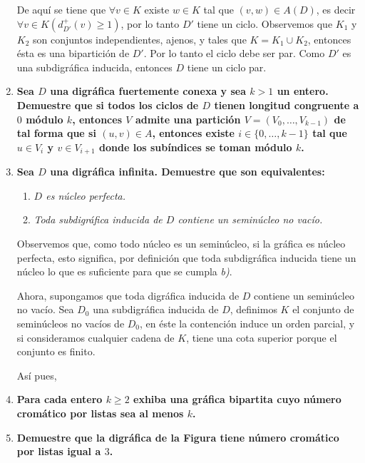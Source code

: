 \documentclass{article}
\begin{document}
\begin{enumerate}
    De aquí se tiene que $\forall v\in K$ existe $w\in K$ tal que $(v,w)\in A(D)$, es decir $\forall v\in K (d^+_{D'}(v)\geq 1)$, por lo tanto $D'$ tiene un ciclo. Observemos que $K_1$ y $K_2$ son conjuntos independientes, ajenos, y tales que $K=K_1\cup K_2$, entonces ésta es una bipartición de $D'$. Por lo tanto el ciclo debe ser par. Como $D'$ es una subdigráfica inducida, entonces $D$ tiene un ciclo par.

  \item \textbf{Sea $D$ una digr\'afica fuertemente conexa y sea $k > 1$ un entero.
    Demuestre que si todos los ciclos de $D$ tienen longitud congruente a
    $0$ m\'odulo $k$, entonces $V$ admite una partici\'on $V = (V_0, \dots,
    V_{k-1})$ de tal forma que si $(u,v) \in A$, entonces existe $i \in
    \{ 0, \dots, k-1 \}$ tal que $u \in V_i$ y $v \in V_{i+1}$ donde los
    sub\'indices se toman m\'odulo $k$.}

  \item \textbf{Sea $D$ una digr\'afica infinita.  Demuestre que son equivalentes:}
    \begin{enumerate}
      \item \textit{$D$ es n\'ucleo perfecta.}

      \item \textit{Toda subdigr\'afica inducida de $D$ contiene un semin\'ucleo no
        vac\'io.}
    \end{enumerate}

    Observemos que, como todo núcleo es un seminúcleo, si la gráfica es núcleo perfecta, esto significa, por definición que toda subdigráfica inducida tiene un núcleo lo que es suficiente para que se cumpla \textit{b)}.

    Ahora, supongamos que toda digráfica inducida de $D$ contiene un seminúcleo no vacío. Sea $D_0$ una subdigráfica inducida de $D$, definimos $K$ el conjunto de seminúcleos no vacíos de $D_0$, en éste la contención induce un orden parcial, y si consideramos cualquier cadena de $K$, tiene una cota superior porque el conjunto es finito.

    Así pues,


  \item \textbf{Para cada entero $k \ge 2$ exhiba una gr\'afica bipartita cuyo
    n\'umero crom\'atico por listas sea al menos $k$.}
    \pagebreak
  \item \textbf{Demuestre que la digr\'afica de la Figura tiene
    n\'umero crom\'atico por listas igual a $3$.}
    \begin{figure}[ht!]
    \centering
\end{figure}
\end{enumerate}
\end{document}
